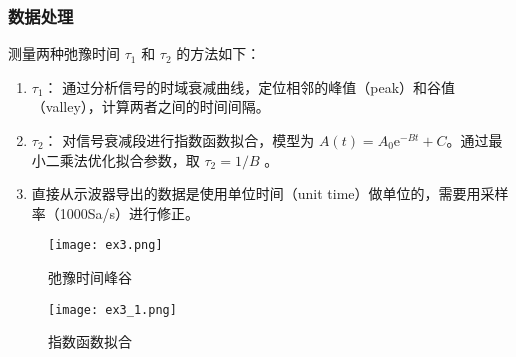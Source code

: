 \subsubsection{数据处理}
测量两种弛豫时间 $\tau_1$ 和 $\tau_2$ 的方法如下：

\begin{enumerate}
    \item \textbf{$\tau_1$}：
    通过分析信号的时域衰减曲线，定位相邻的峰值（peak）和谷值（valley），计算两者之间的时间间隔。
    \item \textbf{$\tau_2$}：
    对信号衰减段进行指数函数拟合，模型为 $A(t) = A_0 \mathrm{e}^{-B t} + C$。通过最小二乘法优化拟合参数，取 $\tau_2 = 1 / B$ 。
    \item 直接从示波器导出的数据是使用单位时间（unit time）做单位的，需要用采样率（1000Sa/s）进行修正。
\end{enumerate}



\begin{figure}[H]
    \centering
    \begin{minipage}[t]{0.48\linewidth}
        \centering
        \texttt{[image: ex3.png]}
        \caption{弛豫时间峰谷}
        \label{fig:relaxation_peaks}
    \end{minipage}
    \hfill
    \begin{minipage}[t]{0.48\linewidth}
        \centering
        \texttt{[image: ex3\_1.png]}
        \caption{指数函数拟合}
        \label{fig:exponential_fit}
    \end{minipage}
\end{figure}


